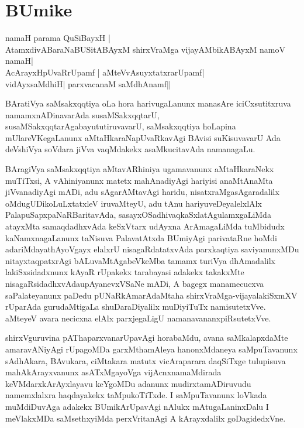 \chapter*{BUmike}

\begin{center}
namaH parama QuSiBayxH |\\
AtamxdivABaraNaBUSitABAyxM shirxVraMga vijayAMbikABAyxM namoV namaH|\\
AcArayxHpUvaRrUpamf | aMteVvAsuyxtatxrarUpamf|\\
vidAyxsaMdhiH| parxvacanaM saMdhAnamf||
\end{center}

BAratiVya saMsakxqqtiya oLa hora harivugaLanunx manasAre iciCxsutitxruva namamxnADinavarAda susaMSakxqqtarU, susaMSakxqqtarAgabayututiruvavarU, saMsakxqqtiya hoLapina mUlareVKegaLanunx aMtaHkaraNapUvaRkavAgi BAvisi suKisuvavarU Ada deVshiVya soVdara jiVva vaqMdakekx asaMkucitavAda namanagaLu.

BAragiVya saMsakxqqtiya aMtavARhiniya ugamavanunx aMtaHkaraNekx muTiTxsi, A vAhiniyanunx matetx mahAnadiyAgi hariyisi anaMtAnaMta jiVvanadiyAgi mADi, adu sAgarAMtavAgi haridu, nisatxraMgasAgaradalilx oMdugUDikoLuLxtatxleV iruvaMteyU, adu tAnu hariyuveDeyalelxlAlx PalapuSapxpaNaRBaritavAda, 
sasayxOSadhivaqkaSxlatAgulamxgaLiMda atayxMta samaqdadhxvAda keSxVtarx udAyxna ArAmaga\break LiMda tuMbidudx kaNamxnagaLanunx taNisuva PalavatAtxda BUmiyAgi parivataRne hoMdi adariMda\break yathAyoVgayx elalxrU nisagaRdatatxvAda parxkaqtiya saviyanunxMDu nitayxtaqpatxrAgi bALuvaMtAgabeVkeMba tamamx turiVya dhAmadalilx lakiSxsidadxnunx kAyaR rUpakekx tarabayasi adakekx takakxMte nisagaRsidadhxvAda\break upAya\-nevxVSaNe mADi, A bagegx manamecucxva saPalateyanunx paDedu pUNaRkAmarAdaMtaha shirxVraMga-vijayalakiSxmXV rUparAda gurudaMtigaLa shuDaraDiyalilx muDiyiTuTx namisutetxVve. aMteyeV avara necicxna elAlx parxjegaLigU namanavananxpiRsutetxVve.

shirxVguruvina pAThaparxvanarUpavAgi horabaMdu, avana saMkalapxdaMte amaravANiyAgi rUpagoMDa garxMthamAleya hanonxMdaneya saMpuTavanunx sAdhAkara, BAvukara, ciMtakara matutx vicAraparara daqSiTxge tulupisuva mahAkArayxvanunx asATxMgayoVga vijAcnxnamaMdirada keVMdarxkArAyxlayavu keYgoMDu adanunx mudirxtamADiruvudu namemxlalxra haqdayakekx taMpukoTiTxde. I saMpuTavanunx loVkada muMdiDuvAga adakekx BUmikArUpavAgi nAlukx mAtugaLaninxDalu I meVlakxMDa saMsethxyiMda perxVritanAgi A kArayxdalilx goDagidedxVne.

